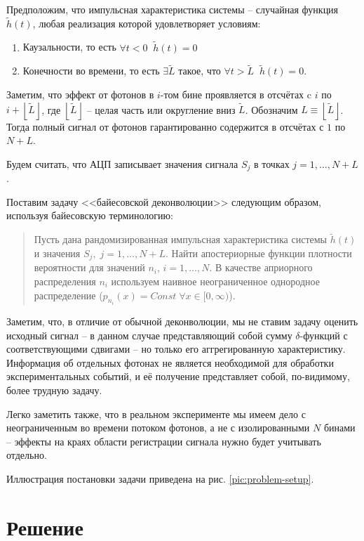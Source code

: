 \documentclass[12pt]{article}
\begin{document}
	Предположим, что импульсная характеристика системы -- случайная функция $\tilde{h}(t)$, любая реализация которой удовлетворяет условиям: 
	\begin{enumerate}
		\item Каузальности, то есть $\forall t < 0 \; \; \tilde{h}(t) = 0$
		\item Конечности во времени, то есть $\exists \tilde{L}$ такое, что $\forall t > \tilde{L} \; \; \tilde{h}(t) = 0$.
	\end{enumerate}

	Заметим, что эффект от фотонов в $i$-том бине проявляется в отсчётах c $i$ по $i + \left \lfloor{\tilde{L}}\right \rfloor$, где $\left \lfloor{\tilde{L}}\right \rfloor$ -- целая часть или округление вниз $\tilde{L}$. Обозначим $L \equiv \left \lfloor{\tilde{L}}\right \rfloor$. Тогда полный сигнал от фотонов гарантированно содержится в отсчётах с $1$ по $N + L$.
	
	Будем считать, что АЦП записывает значения сигнала $S_j$ в точках $j = 1, \ldots, N + L$.
	
	Поставим задачу <<байесовской деконволюции>> следующим образом, используя байесовскую терминологию:
	
	\begin{quote}
		Пусть дана рандомизированная импульсная характеристика системы $\tilde{h}(t)$ и значения $S_j, \; j = 1, \ldots, N + L$. Найти апостериорные функции плотности вероятности для значений $n_i$, $i = 1, \ldots, N$. В качестве априорного распределения $n_i$ используем наивное неограниченное однородное распределение ($p_{n_i}(x) = Const \; \forall x \in [0, \infty)$).
	\end{quote}
	
	Заметим, что, в отличие от обычной деконволюции, мы не ставим задачу оценить исходный сигнал -- в данном случае представляющий собой сумму $\delta$-функций с соответствующими сдвигами -- но только его аггрегированную характеристику. Информация об отдельных фотонах не является необходимой для обработки экспериментальных событий, и её получение представляет собой, по-видимому, более трудную задачу.
	
	Легко заметить также, что в реальном эксперименте мы имеем дело с неограниченным во времени потоком фотонов, а не с изолированными $N$ бинами -- эффекты на краях области регистрации сигнала нужно будет учитывать отдельно.
	
	Иллюстрация постановки задачи приведена на рис. \ref{pic:problem-setup}.

	\section{Решение}
\end{document}
